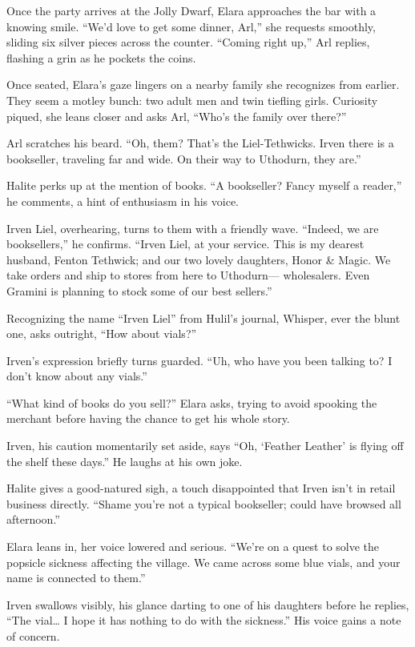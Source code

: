 \documentclass[
  letterpaper,12pt,twoside,twocolumn,openany,
  nodeprecatedcode,bg=full]{dndbook}
\begin{document}
Once the party arrives at the Jolly Dwarf, Elara approaches the bar with
a knowing smile. ``We'd love to get some dinner, Arl,'' she requests
smoothly, sliding six silver pieces across the counter. ``Coming right
up,'' Arl replies, flashing a grin as he pockets the coins.

Once seated, Elara's gaze lingers on a nearby family she recognizes from
earlier. They seem a motley bunch: two adult men and twin tiefling
girls. Curiosity piqued, she leans closer and asks Arl, ``Who's the
family over there?''

Arl scratches his beard. ``Oh, them? That's the Liel-Tethwicks. Irven
there is a bookseller, traveling far and wide. On their way to Uthodurn,
they are.''

Halite perks up at the mention of books. ``A bookseller? Fancy myself a
reader,'' he comments, a hint of enthusiasm in his voice.

Irven Liel, overhearing, turns to them with a friendly wave. ``Indeed,
we are booksellers,'' he confirms. ``Irven Liel, at your service. This
is my dearest husband, Fenton Tethwick; and our two lovely daughters,
Honor \& Magic. We take orders and ship to stores from here to
Uthodurn--- wholesalers. Even Gramini is planning to stock some of our
best sellers.''

Recognizing the name ``Irven Liel'' from Hulil's journal, Whisper, ever
the blunt one, asks outright, ``How about vials?''

Irven's expression briefly turns guarded. ``Uh, who have you been
talking to? I don't know about any vials.''

``What kind of books do you sell?'' Elara asks, trying to avoid spooking
the merchant before having the chance to get his whole story.

Irven, his caution momentarily set aside, says ``Oh, `Feather Leather'
is flying off the shelf these days.'' He laughs at his own joke.

Halite gives a good-natured sigh, a touch disappointed that Irven isn't
in retail business directly. ``Shame you're not a typical bookseller;
could have browsed all afternoon.''

Elara leans in, her voice lowered and serious. ``We're on a quest to
solve the popsicle sickness affecting the village. We came across some
blue vials, and your name is connected to them.''

Irven swallows visibly, his glance darting to one of his daughters
before he replies, ``The vial\ldots{} I hope it has nothing to do with
the sickness.'' His voice gains a note of concern.
\end{document}
